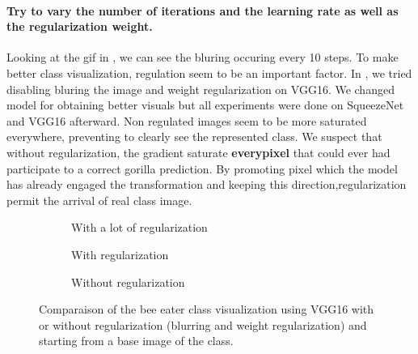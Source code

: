 \paragraph*{Try to vary the number of iterations and the learning rate as well as the regularization weight.}
Looking at the gif in , we can see the bluring occuring every 10 steps. 
To make better class visualization, regulation seem to be an important factor. In , we tried disabling bluring the image and weight regularization on VGG16. We changed model for obtaining better visuals but all experiments were done on SqueezeNet and VGG16 afterward. Non regulated images seem to be more saturated everywhere, preventing to clearly see the represented class. We suspect that without regularization, the gradient saturate \textbf{everypixel} that could ever had participate to a correct gorilla prediction. By promoting pixel which the model has already engaged the transformation and keeping this direction,regularization permit the arrival of real class image.
\begin{figure}[H]
    \centering
    \begin{subfigure}[t]{.33\textwidth}
        \centering
        \caption{With a lot of regularization}
        \label{fig:class_viz_reg:sub1}
    \end{subfigure}%
    \begin{subfigure}[t]{.33\textwidth}
        \centering
        \caption{With regularization}
        \label{fig:class_viz_reg:sub2}
    \end{subfigure}%
    \begin{subfigure}[t]{.33\textwidth}
        \centering
        \caption{Without regularization}
        \label{fig:class_viz_reg:sub3}
    \end{subfigure}

    \caption{Comparaison of the bee eater class visualization using VGG16 with or without regularization (blurring and weight regularization) and starting from a base image of the class.}
    \label{fig:class_viz_reg}
\end{figure}

